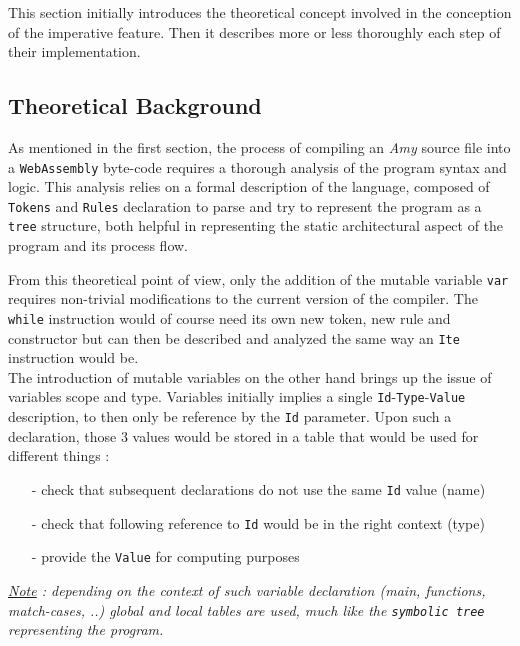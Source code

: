 This section initially introduces the theoretical concept involved in the conception of the imperative feature. Then it describes more or less thoroughly each step of their implementation.

\subsection{Theoretical Background\cite{cours}}
As mentioned in the first section, the process of compiling an \textsl{Amy} source file into a \texttt{WebAssembly} byte-code requires a thorough analysis of the program syntax and logic. This analysis relies on a formal description of the  language, composed of \texttt{Tokens} and \texttt{Rules} declaration to parse and try to represent the program as a \texttt{tree} structure, both helpful in representing the static architectural aspect of the program and its process flow.
 
 From this theoretical point of view, only the addition of the mutable variable \texttt{var} requires non-trivial modifications to the current version of the compiler. The \texttt{while} instruction would of course need its own new token, new rule and constructor but can then be described and analyzed the same way an \texttt{Ite} instruction would be. \\
 
 The introduction of mutable variables on the other hand brings up the issue of variables scope and type. Variables initially implies a single \texttt{Id}-\texttt{Type}-\texttt{Value} description, to then only be reference by the \texttt{Id} parameter. Upon such a declaration, those 3 values would be stored in a table that would be used for different things :
 \begin{itemize}
     \item[-] check that subsequent declarations do not use the same \texttt{Id} value (name)
     \item[-] check that following reference to \texttt{Id} would be in the right context (type)
     \item[-] provide the \texttt{Value} for computing purposes
 \end{itemize}

\small\textit{\underline{Note} : depending on the context of such variable declaration (main, functions, match-cases, ..) global and local tables are used, much like the \texttt{symbolic tree} representing the program.}
\normalsize \\

